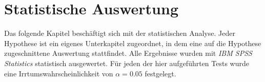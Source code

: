 \documentclass[a4paper,11pt]{article}%
\renewcommand{\\}{\vspace*{0.5\baselineskip} \newline}
\begin{document}
%    
%    
%    
%    
%    
%


\clearpage
\section{Statistische Auswertung}
Das folgende Kapitel beschäftigt sich mit der statistischen Analyse. Jeder Hypothese ist ein eigenes Unterkapitel zugeordnet, in dem eine auf die Hypothese zugeschnittene Auswertung stattfindet. Alle Ergebnisse wurden mit \textit{IBM SPSS Statistics} statistisch ausgewertet. 
Für jeden der hier aufgeführten Tests wurde eine Irrtumswahrscheinlichkeit von  $\alpha = 0.05$ festgelegt.
\end{document}
